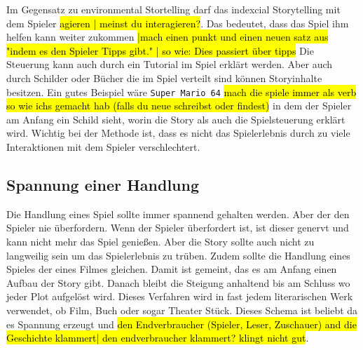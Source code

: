 Im Gegensatz zu environmental Stortelling darf das indexcial Storytelling mit dem Spieler \hl{agieren | meinst du interagieren?}. Das bedeutet, dass das Spiel ihm helfen kann weiter zukommen \hl{|mach einen punkt und einen neuen satz aus "indem es den Spieler Tipps gibt." | so wie: Dies passiert über tipps} Die Steuerung kann auch durch ein Tutorial im Spiel erklärt werden. Aber auch durch Schilder oder Bücher die im Spiel verteilt sind können Storyinhalte besitzen. Ein gutes Beispiel wäre \verb+Super Mario 64+ \hl{mach die spiele immer als verb so wie ichs gemacht hab (falls du neue schreibst oder findest)} in dem der Spieler am Anfang ein Schild sieht, worin die Story als auch die Spielsteuerung erklärt wird. Wichtig bei der Methode ist, dass es nicht das Spielerlebnis durch zu viele Interaktionen mit dem Spieler verschlechtert. 

\subsection{Spannung einer Handlung}
Die Handlung eines Spiel sollte immer spannend gehalten werden. Aber der den Spieler nie überfordern. Wenn der Spieler überfordert ist, ist dieser genervt und kann nicht mehr das Spiel genießen. Aber die Story sollte auch nicht zu langweilig sein um das Spielerlebnis zu trüben. Zudem sollte die Handlung eines Spieles der eines Filmes gleichen. Damit ist gemeint, das es am Anfang einen Aufbau der Story gibt. Danach bleibt die Steigung anhaltend bis am Schluss wo jeder Plot aufgelöst wird. Dieses Verfahren wird in fast jedem literarischen Werk verwendet, ob Film, Buch oder sogar Theater Stück. Dieses Schema ist beliebt da es Spannung erzeugt und \hl{den Endverbraucher (Spieler, Leser, Zuschauer) and die Geschichte klammert| den endverbraucher klammert? klingt nicht gut}. 

